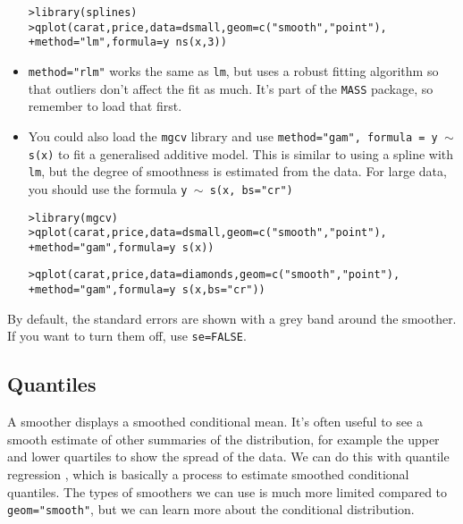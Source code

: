 \begin{itemize}
\begin{alltt}
> library(splines)
> qplot(carat, price, data = dsmall, geom = c("smooth", "point"), 
+     method = "lm", formula = y ~ ns(x, 3))
\end{alltt}
\begin{alltt}

\end{alltt}

	\item {\tt method="rlm"} works the same as {\tt lm}, but uses a robust fitting algorithm so that outliers don't affect the fit as much.  It's part of the {\tt MASS} package, so remember to load that first.

	\item You could also load the {\tt mgcv} library and use {\tt method="gam", formula = y $\sim$ s(x)} to fit a generalised additive model.  This is similar 
to using a spline with {\tt lm}, but the degree of smoothness is estimated from the data.  For large data, you should use the formula {\tt y $\sim$ s(x, bs="cr")}
 
\begin{alltt}
> library(mgcv)
> qplot(carat, price, data = dsmall, geom = c("smooth", "point"), 
+     method = "gam", formula = y ~ s(x))
\end{alltt}
\begin{alltt}

> qplot(carat, price, data = diamonds, geom = c("smooth", "point"), 
+     method = "gam", formula = y ~ s(x, bs = "cr"))
\end{alltt}
\begin{alltt}

\end{alltt}

\end{itemize}

By default, the standard errors are shown with a grey band around the smoother.  If you want to turn them off, use {\tt se=FALSE}.

\subsection{Quantiles}\label{sub:quantiles}

A smoother displays a smoothed conditional mean.  It's often useful to see a smooth estimate of other summaries of the distribution, for example the upper and lower quartiles to show the spread of the data.  We can do this with quantile regression \citep{koenker:2005}, which is basically a process to estimate smoothed conditional quantiles.  The types of smoothers we can use is much more limited compared to {\tt geom="smooth"}, but we can learn more about the conditional distribution.

